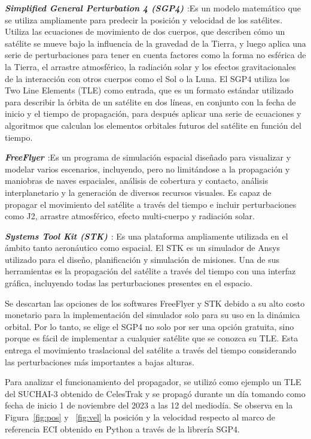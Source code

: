 \textbf{\textit{Simplified General Perturbation 4 (SGP4) \cite{ref37}}}:Es un modelo matemático que se utiliza ampliamente para predecir la posición y velocidad de los satélites. Utiliza las ecuaciones de movimiento de dos cuerpos, que describen cómo un satélite se mueve bajo la influencia de la gravedad de la Tierra, y luego aplica una serie de perturbaciones para tener en cuenta factores como la forma no esférica de la Tierra, el arrastre atmosférico, la radiación solar y los efectos gravitacionales de la interacción con otros cuerpos como el Sol o la Luna. El SGP4 utiliza los Two Line Elements (TLE) como entrada, que es un formato estándar utilizado para describir la órbita de un satélite en dos líneas, en conjunto con la fecha de inicio y el tiempo de propagación, para después aplicar una serie de ecuaciones y algoritmos que calculan los elementos orbitales futuros del satélite en función del tiempo.

\textbf{\textit{FreeFlyer \cite{ref38}}}:Es un programa de simulación espacial diseñado para visualizar y modelar varios escenarios, incluyendo, pero no limitándose a la propagación y maniobras de naves espaciales, análisis de cobertura y contacto, análisis interplanetario y la generación de diversos recursos visuales. Es capaz de propagar el movimiento del satélite a través del tiempo e incluir perturbaciones como J2, arrastre atmosférico, efecto multi-cuerpo y radiación solar.

\textbf{\textit{Systems Tool Kit (STK) \cite{ref34}}}: Es una plataforma ampliamente utilizada en el ámbito tanto aeronáutico como espacial. El STK es un simulador de Ansys utilizado para el diseño, planificación y simulación de misiones. Una de sus herramientas es la propagación del satélite a través del tiempo con una interfaz gráfica, incluyendo todas las perturbaciones presentes en el espacio.

Se descartan las opciones de los softwares FreeFlyer y STK debido a su alto costo monetario para la implementación del simulador solo para su uso en la dinámica orbital. Por lo tanto, se elige el SGP4 no solo por ser una opción gratuita, sino porque es fácil de implementar a cualquier satélite que se conozca su TLE. Esta entrega el movimiento traslacional del satélite a través del tiempo considerando las perturbaciones más importantes a bajas alturas.

Para analizar el funcionamiento del propagador, se utilizó como ejemplo un TLE del SUCHAI-3 obtenido de CelesTrak y se propagó durante un día tomando como fecha de inicio 1 de noviembre del 2023 a las 12 del mediodía. Se observa en la Figura~\ref{fig:pos} y ~\ref{fig:vel} la posición y la velocidad respecto al marco de referencia ECI obtenido en Python a través de la librería SGP4.

